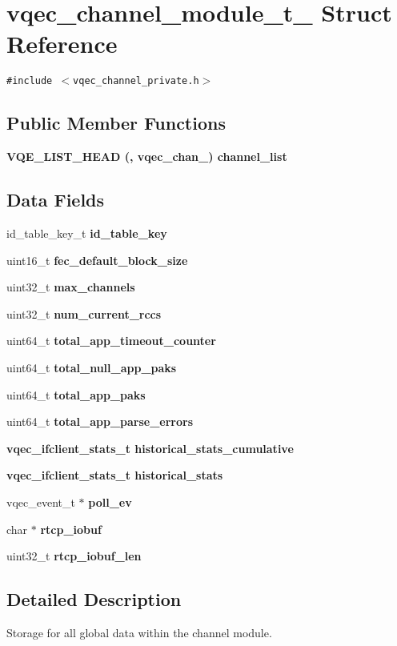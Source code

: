 \section{vqec\_\-channel\_\-module\_\-t\_\- Struct Reference}
\label{structvqec__channel__module__t__}
{\tt \#include $<$vqec\_\-channel\_\-private.h$>$}

\subsection*{Public Member Functions}
\begin{CompactItemize}
\item 
\bf{VQE\_\-LIST\_\-HEAD} (, \bf{vqec\_\-chan\_\-}) channel\_\-list
\end{CompactItemize}
\subsection*{Data Fields}
\begin{CompactItemize}
\item 
id\_\-table\_\-key\_\-t \bf{id\_\-table\_\-key}
\item 
uint16\_\-t \bf{fec\_\-default\_\-block\_\-size}
\item 
uint32\_\-t \bf{max\_\-channels}
\item 
uint32\_\-t \bf{num\_\-current\_\-rccs}
\item 
uint64\_\-t \bf{total\_\-app\_\-timeout\_\-counter}
\item 
uint64\_\-t \bf{total\_\-null\_\-app\_\-paks}
\item 
uint64\_\-t \bf{total\_\-app\_\-paks}
\item 
uint64\_\-t \bf{total\_\-app\_\-parse\_\-errors}
\item 
\bf{vqec\_\-ifclient\_\-stats\_\-t} \bf{historical\_\-stats\_\-cumulative}
\item 
\bf{vqec\_\-ifclient\_\-stats\_\-t} \bf{historical\_\-stats}
\item 
vqec\_\-event\_\-t $\ast$ \bf{poll\_\-ev}
\item 
char $\ast$ \bf{rtcp\_\-iobuf}
\item 
uint32\_\-t \bf{rtcp\_\-iobuf\_\-len}
\end{CompactItemize}


\subsection{Detailed Description}
Storage for all global data within the channel module. 



